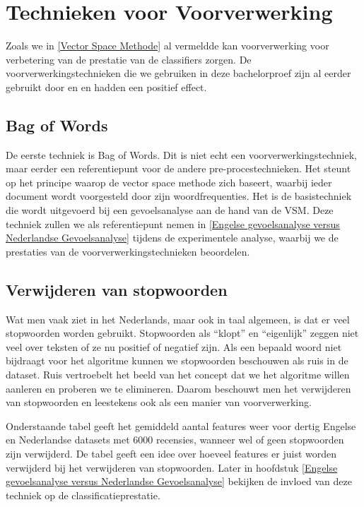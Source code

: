 \section{Technieken voor Voorverwerking}\label{Technieken voor Pre-Processing}

Zoals we in \ref{Vector Space Methode} al vermeldde kan voorverwerking voor verbetering van de prestatie van de classifiers zorgen. De voorverwerkingstechnieken die we gebruiken in deze bachelorproef zijn al eerder gebruikt door \cite{pang2002thumbs} en \cite{wang2011sentiment} en hadden een positief effect.

\subsection{Bag of Words}\label{Bag of Words}

De eerste techniek is Bag of Words. Dit is niet echt een voorverwerkingstechniek, maar eerder een referentiepunt voor de andere pre-procestechnieken. Het steunt op het principe waarop de vector space methode zich baseert, waarbij ieder document wordt voorgesteld door zijn woordfrequenties. Het is de basistechniek die wordt uitgevoerd bij een gevoelsanalyse aan de hand van de VSM. Deze techniek zullen we als referentiepunt nemen in \ref{Engelse gevoelsanalyse versus Nederlandse Gevoelsanalyse} tijdens de experimentele analyse, waarbij we de prestaties van de voorverwerkingstechnieken beoordelen.

\subsection{Verwijderen van stopwoorden}\label{Verwijderen van stopwoorden en leestekens}

Wat men vaak ziet in het Nederlands, maar ook in taal algemeen, is dat er veel stopwoorden worden gebruikt. Stopwoorden als ``klopt'' en ``eigenlijk'' zeggen niet veel over teksten of ze nu positief of negatief zijn. Als een bepaald woord niet bijdraagt voor het algoritme kunnen we stopwoorden beschouwen als ruis in de dataset. Ruis vertroebelt het beeld van het concept dat we het algoritme willen aanleren en proberen we te elimineren. Daarom beschouwt men het verwijderen van stopwoorden en leestekens ook als een manier van voorverwerking.

Onderstaande tabel geeft het gemiddeld aantal features weer voor dertig Engelse en Nederlandse datasets met 6000 recensies, wanneer wel of geen stopwoorden zijn verwijderd. De tabel geeft een idee over hoeveel features er juist worden verwijderd bij het verwijderen van stopwoorden. Later in hoofdstuk \ref{Engelse gevoelsanalyse versus Nederlandse Gevoelsanalyse} bekijken de invloed van deze techniek op de classificatieprestatie.

